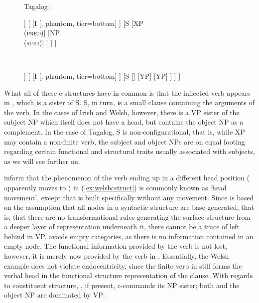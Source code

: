 \begin{figure}
\a Tagalog \citep[131]{kroeger1991}:\label{ex:tagalogcstruct}\medskip \\
\begin{minipage}[t]{.5\remaining}
\begin{forest}
[IP
	[SPEC
		[, phantom, tier=bottom]
	]
	[
		[I
			[, phantom, tier=bottom]
		]
		[S
			[{XP\\ (\textsc{pred})}]
			[{NP\\ (\textsc{subj})}]
		]
	]
]
\end{forest}
\end{minipage}
~
\begin{minipage}[t]{.5\remaining}
\begin{forest}
[IP
	[SPEC
		[, phantom, tier=bottom]
	]
	[
		[I
			[, phantom, tier=bottom]
		]
		[S
			[]
			[YP]
			[YP]
		]
	]
]
\end{forest}
\end{minipage}
\xe
\end{figure}

What all of these c-structures have in common is that the inflected verb
appears in , which is a sister of S. S, in turn, is a small clause
containing the arguments of the verb. In the cases of Irish and Welsh, however,
there is a VP sister of the subject NP which itself does not have a head, but
contains the object NP as a complement. In the case of Tagalog, S is
non-configurational, that is, while XP may contain a non-finite verb, the
subject and object NPs are on equal footing regarding certain functional
and structural traits usually associated with subjects, as we will see further
on.

\citet[129--138]{bresnan2016} inform that the phenomenon of the verb ending up
in a different head position ( apparently moves to ) in
(\ref{ex:welshcstruct}) is commonly known as `head movement', except that
\Lfg{} is built specifically without any movement. Since \Lfg{} is based
on the assumption that all nodes in a syntactic structure are base-generated,
that is, that there are no transformational rules generating the surface
structure from a deeper layer of representation underneath it, there cannot be
a trace of  left behind in VP. \Lfg{} avoids empty categories, as
there is no information contained in an empty node. The functional information
provided by the verb is not lost, however, it is merely now provided by the
verb in . Essentially, the Welsh example does not violate
endocentricity, since the finite verb in  still forms the verbal head
in the functional structure representation of the clause. With regards to
constituent structure, , if present, c-commands its NP sister; both
 and the object NP are dominated by VP:

